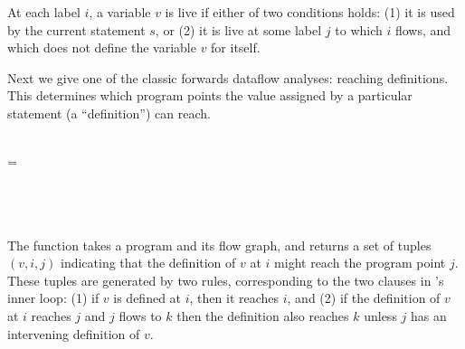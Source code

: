 \noindent
At each label $i$, a variable $v$ is live if either of two conditions holds: (1)
it is used by the current statement $s$, or (2) it is live at some label $j$ to
which $i$ flows, and which does not define the variable $v$ for itself.

Next we give one of the classic forwards dataflow analyses: reaching
definitions. This determines which program points the value assigned by a
particular statement (a ``definition'') can reach.

\begin{code}
   \isa \iso{} \to \iso{} \to
  \\
   \< \< =\\
  \quad {}\\
  \quad {}\\
  \quad \phantom{{} \cup}
  \\
  \quad  \cup {}
\end{code}

\noindent
The function  takes a program and its flow graph, and returns a
set of tuples $(v, i, j)$ indicating that the definition of $v$ at $i$ might
reach the program point $j$. These tuples are generated by two rules,
corresponding to the two clauses in 's inner loop: (1) if $v$ is
defined at $i$, then it reaches $i$, and (2) if the definition of $v$ at $i$
reaches $j$ and $j$ flows to $k$ then the definition also reaches $k$ unless $j$
has an intervening definition of $v$.
